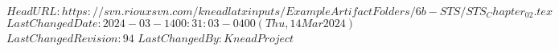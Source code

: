 \svnidlong
{$HeadURL: https://svn.riouxsvn.com/kneadlatxinputs/ExampleArtifactFolders/6b-STS/STS_Chapter_02.tex $}
{$LastChangedDate: 2024-03-14 00:31:03 -0400 (Thu, 14 Mar 2024) $}
{$LastChangedRevision: 94 $}
{$LastChangedBy: KneadProject $}


%
%
%
%
%
%
%


